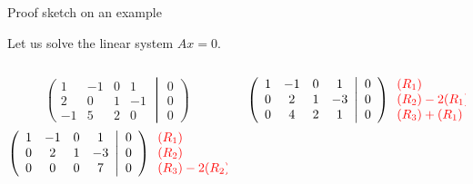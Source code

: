 \documentclass{beamer}
\begin{document}
\begin{frame}[t]{Proof sketch on an example}
	\grid

	Let us solve the linear system $Ax = 0$.
	\begin{columns}
		\hspace*{-0.7cm}
		\begin{column}{0.40\textwidth}
			$$
			\left(
				\begin{array}{cccc}
					1  & -1 & 0 & 1 \\
					2  & 0 & 1 & -1 \\
					-1  & 5 & 2 & 0 
				\end{array}
				\middle|
				\begin{array}{c}
					0 \\
					0 \\
					0
				\end{array}
			\right)
			$$
			$$
			\left(
				\begin{array}{cccc}
					1  & -1 & 0 & 1 \\
					0  & 2 & 1 & -3 \\
					0  & 0 & 0 & 7 
				\end{array}
				\middle|
				\begin{array}{c}
					0 \\
					0 \\
					0
				\end{array}
			\right)
			{\color{red}
				\begin{array}{l}
					(R_1)\\
					(R_2)\\
					(R_3) -2 (R_2)
				\end{array}
			}
			$$
		\end{column}
		\begin{column}{0.55\textwidth}
			\vspace{-1.9cm}
			$$
			\left(
				\begin{array}{cccc}
					1  & -1 & 0 & 1 \\
					0  & 2 & 1 & -3 \\
					0  & 4 & 2 & 1 
				\end{array}
				\middle|
				\begin{array}{c}
					0 \\
					0 \\
					0
				\end{array}
			\right)
			{\color{red}
				\begin{array}{l}
					(R_1)\\
					(R_2) - 2 (R_1) \\
					(R_3) + (R_1)
				\end{array}
			}
			$$
		\end{column}
	\end{columns}


\end{frame}
\end{document}
